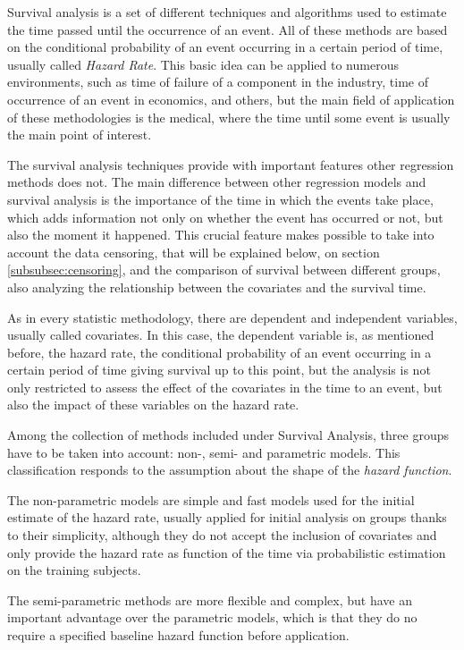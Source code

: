 \documentclass[11pt]{article} %
\begin{document}
    Survival analysis is a set of different techniques and algorithms used to estimate the time passed until the occurrence of an event. All of these methods are based on the conditional probability of an event occurring in a certain period of time, usually called \emph{Hazard Rate}. This basic idea can be applied to numerous environments, such as time of failure of a component in the industry, time of occurrence of an event in economics, and others, but the main field of application of these methodologies is the medical, where the time until some event is usually the main point of interest.

    The survival analysis techniques provide with important features other regression methods does not. The main difference between other regression models and survival analysis is the importance of the time in which the events take place, which adds information not only on whether the event has occurred or not, but also the moment it happened. This crucial feature makes possible to take into account the data censoring, that will be explained below, on section \ref{subsubsec:censoring}, and the comparison of survival between different groups, also analyzing the relationship between the covariates and the survival time.

    As in every statistic methodology, there are dependent and independent variables, usually called covariates. In this case, the dependent variable is, as mentioned before, the hazard rate, the conditional probability of an event occurring in a certain period of time giving survival up to this point, but the analysis is not only restricted to assess the effect of the covariates in the time to an event, but also the impact of these variables on the hazard rate.

    Among the collection of methods included under Survival Analysis, three groups have to be taken into account: non-, semi- and parametric models. This classification responds to the assumption about the shape of the \emph{hazard function}.

    The non-parametric models are simple and fast models used for the initial estimate of the hazard rate, usually applied for initial analysis on groups thanks to their simplicity, although they do not accept the inclusion of covariates and only provide the hazard rate as function of the time via probabilistic estimation on the training subjects.

    The semi-parametric methods are more flexible and complex, but have an important advantage over the parametric models, which is that they do no require a specified baseline hazard function before application.
\end{document}
